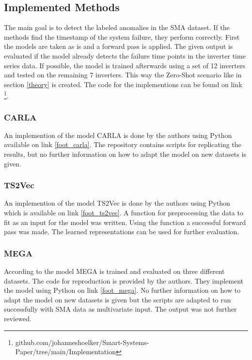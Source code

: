 
\subsection{Implemented Methods}
The main goal is to detect the labeled anomalies in the SMA dataset. If the methods find the timestamp of the system failure, they perform correctly. First the models are taken as is and a forward pass is applied. The given output is evaluated if the model already detects the failure time points in the inverter time series data. If possible, the model is trained afterwards using a set of 12 inverters and tested on the remaining 7 inverters. This way the Zero-Shot scenario like in section \ref{theory} is created.
The code for the implementions can be found on link \footnote{\fussy\tiny github.com/johanneshoelker/Smart-Systems-Paper/tree/main/Implementation}.

\subsubsection{CARLA}
An implemention of the model CARLA is done by the authors using Python available on link \ref{foot_carla}. The repository contains scripts for replicating the results, but no further information on how to adapt the model on new datasets is given.

\subsubsection{TS2Vec}
An implemention of the model TS2Vec is done by the authors using Python which is available on link \ref{foot_ts2vec}. A function for preprocessing the data to fit as an input for the model was written.
Using the function a successful forward pass was made. The learned representations can be used for further evaluation.

\subsubsection{MEGA}
According to \cite{wang_multiscale_2023} the model MEGA is trained and evaluated on three different datasets. The code for reproduction is provided by the authors. They implement the model using Python on link \ref{foot_mega}. No further information on how to adapt the model on new datasets is given but the scripts are adapted to run successfully with SMA data as multivariate input. The output was not further reviewed.

